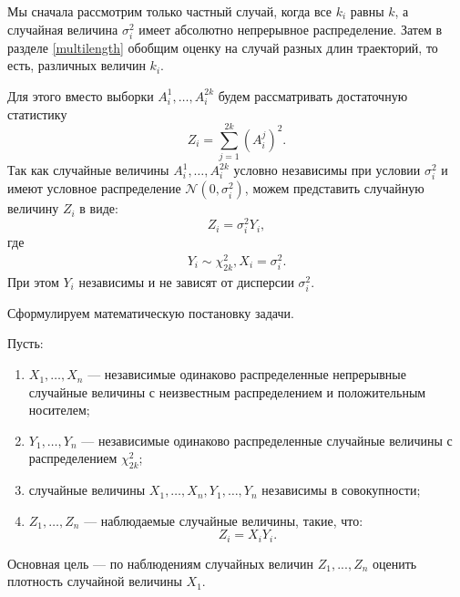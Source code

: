 \documentclass[../paper.tex]{subfiles}
\begin{document}
Мы сначала рассмотрим только частный случай,
когда все $k_i$ равны $k$, а случайная величина $\sigma_i^2$ имеет абсолютно непрерывное распределение.
Затем в разделе \ref{multilength} обобщим оценку на случай разных длин траекторий, то есть, различных величин $k_i$.

Для этого вместо выборки $A_i^1, \dots, A_i^{2k}$ будем рассматривать
достаточную статистику 
\[
	Z_i = \sum\limits_{j=1}^{2k} \left(A_i^j\right)^2
.\]
Так как случайные величины $A_i^1, \dots, A_i^{2k}$ условно независимы при условии $\sigma_i^2$ и имеют условное
распределение $\mathcal{N}\left(0, \sigma_i^2\right)$, можем представить случайную величину $Z_i$ в виде:
\[
Z_i = \sigma_i^2 Y_i,
\]
где 
\begin{align*}
	Y_i \sim \chi^2_{2k},
	X_i = \sigma_i^2
.\end{align*}
При этом $Y_i$ независимы и не зависят от дисперсии $\sigma_i^2$.

Сформулируем математическую постановку задачи.

\begin{Probl}
	Пусть:
	\begin{enumerate}
		\item $X_1, \dots, X_n$ --- независимые одинаково распределенные непрерывные случайные величины
			с неизвестным распределением и положительным носителем; 
		\item $Y_1, \dots, Y_n$ --- независимые одинаково распределенные случайные величины с распределением $\chi^2_{2k}$;
		\item случайные величины $X_1, \dots, X_n, Y_1, \dots, Y_n$ независимы в совокупности;
		\item $Z_1, \dots, Z_n$ --- наблюдаемые случайные величины, такие, что:
			\[
				Z_i = X_i Y_i
			.\]
	\end{enumerate}
	Основная цель --- по наблюдениям случайных величин $Z_1, ..., Z_n$ оценить плотность случайной величины $X_1$.
\end{Probl}
\end{document}
